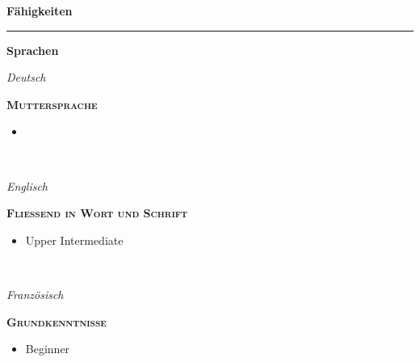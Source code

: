 \documentclass[8pt]{article}
\newcommand{\cvSection}[1]{
  \medskip
  {\Large \color{cvColor} \textbf{#1}}\\
  \parbox{\linewidth}{\rule{\linewidth}{1pt}}
  \par
}
\newcommand{\cvEducationHeading}[2]{%
  {\centering\colorbox{cvBackgroundColor}{\parbox{0.98\linewidth}{\textbf{#1} \hfill \textit{\footnotesize #2}}}} \par
}
\newcommand{\cvItem}[2]{%
  \begin{minipage}[t]{0.15\linewidth}
    \raggedleft%
    #1
  \end{minipage}
  \hspace{0.02\linewidth}
  \vrule
  \hspace{0.02\linewidth}
  \begin{minipage}[t]{0.75\linewidth}
    #2
  \end{minipage}\newline
}
\newenvironment{cvEducationItem}[2]{
  \medskip
  \par
  \begin{minipage}[c]{0.15\linewidth}
    \raggedleft
    \footnotesize
    \textit{#1}
  \end{minipage}
  \quad
  \vrule
  \quad
  \begin{minipage}[t]{0.7\linewidth}
    \textsc{\color{cvColor} \textbf{#2}}
    \footnotesize
    \begin{itemize}[itemsep=-1mm, leftmargin=3mm]
}{
    \end{itemize}
  \end{minipage}
  \\[0.5em]
}
\newenvironment{cvSkillsItem}[1]{
  \cvEducationHeading{#1}{}
  \renewcommand{\item}[2]{%
    \begin{minipage}[t]{0.1\textwidth}
      \raggedleft
      \small
      ##1
    \end{minipage}
    \quad
    \vrule
    \quad
    \begin{minipage}[t]{0.35\textwidth}
      \footnotesize
      ##2
    \end{minipage}
    \\
  }
}{
}
\begin{document}
  \cvSection{Fähigkeiten}


  \cvEducationHeading{Sprachen}{}
  \begin{multicols}{2}
  \begin{cvEducationItem}{Deutsch}{Muttersprache}
    \item
  \end{cvEducationItem}
  \begin{cvEducationItem}{Englisch}{Fließend in Wort und Schrift}
    \item Upper Intermediate
  \end{cvEducationItem}
  \begin{cvEducationItem}{Französisch}{Grundkenntnisse}
    \item Beginner
  \end{cvEducationItem}
  \end{multicols}
\end{document}
